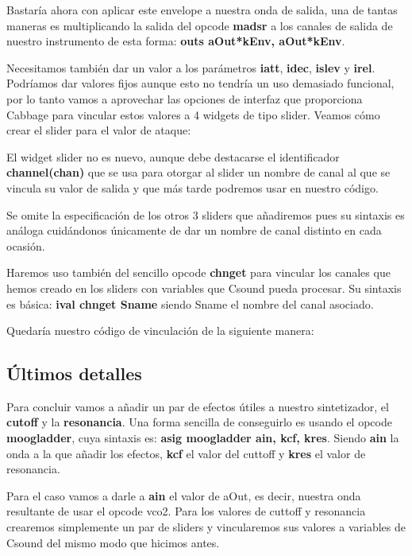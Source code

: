 Bastaría ahora con aplicar este envelope a nuestra onda de salida, una de tantas maneras es multiplicando la salida del opcode \textbf{madsr} a los canales de salida de nuestro instrumento de esta forma: \textbf{outs aOut*kEnv, aOut*kEnv}.

Necesitamos también dar un valor a los parámetros \textbf{iatt}, \textbf{idec}, \textbf{islev} y \textbf{irel}. Podríamos dar valores fijos aunque esto no tendría un uso demasiado funcional, por lo tanto vamos a aprovechar las opciones de interfaz que proporciona Cabbage para vincular estos valores a 4 widgets de tipo slider.
Veamos cómo crear el slider para el valor de ataque:


El widget slider no es nuevo, aunque debe destacarse el identificador \textbf{channel(chan)} que se usa para otorgar al slider un nombre de canal al que se vincula su valor de salida y que más tarde podremos usar en nuestro código.

Se omite la especificación de los otros 3 sliders que añadiremos pues su sintaxis es análoga cuidándonos únicamente de dar un nombre de canal distinto en cada ocasión.

Haremos uso también del sencillo opcode \textbf{chnget} para vincular los canales que hemos creado en los sliders con variables que Csound pueda procesar. Su sintaxis es básica: \textbf{ival chnget Sname} siendo Sname el nombre del canal asociado.

Quedaría nuestro código de vinculación de la siguiente manera:


\subsection{Últimos detalles}\label{sec:detalles}

Para concluir vamos a añadir un par de efectos útiles a nuestro sintetizador, el \textbf{cutoff} y la \textbf{resonancia}. Una forma sencilla de conseguirlo es usando el opcode \textbf{moogladder}, cuya sintaxis es: \textbf{asig moogladder ain, kcf, kres}. Siendo \textbf{ain} la onda a la que añadir los efectos, \textbf{kcf} el valor del cuttoff y \textbf{kres} el valor de resonancia.

Para el caso vamos a darle a \textbf{ain} el valor de aOut, es decir, nuestra onda resultante de usar el opcode vco2. Para los valores de cuttoff y resonancia crearemos simplemente un par de sliders y vincularemos sus valores a variables de Csound del mismo modo que hicimos antes.
\pagebreak

